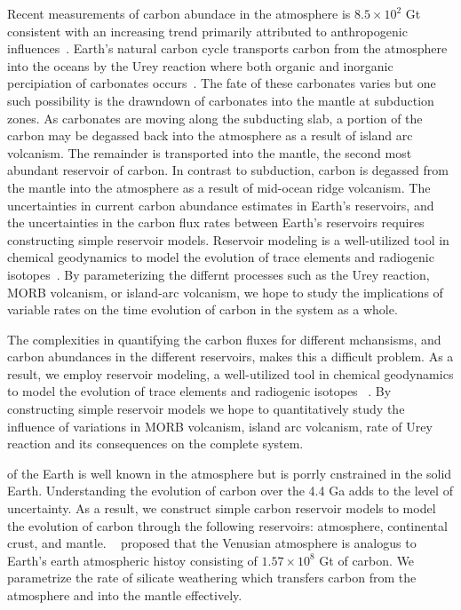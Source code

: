 Recent measurements of carbon abundace in the atmosphere is $8.5 \times 10^2$ Gt~\cite{NOAA:2017} consistent with an increasing trend primarily attributed to anthropogenic influences~\cite{DDJ:2015}. Earth's natural carbon cycle transports carbon from the atmosphere into the oceans by the Urey reaction where both organic and inorganic percipiation of carbonates occurs~\cite{UHC:1952}. The fate of these carbonates varies but one such possibility is the drawndown of carbonates into the mantle at subduction zones. As carbonates are moving along the subducting slab, a portion of the carbon may be degassed back into the atmosphere as a result of island arc volcanism. The remainder is transported into the mantle, the second most abundant reservoir of carbon. In contrast to subduction, carbon is degassed from the mantle into the atmosphere as a result of mid-ocean ridge volcanism. The uncertainties in current carbon abundance estimates in Earth's reservoirs, and the uncertainties in the carbon flux rates between Earth's reservoirs requires constructing simple reservoir models. Reservoir modeling is a well-utilized tool in chemical geodynamics to model the evolution of trace elements and radiogenic isotopes~\cite{ACJ-BO-DB:1980}. By parameterizing the differnt processes such as the Urey reaction, MORB volcanism, or island-arc volcanism, we hope to study the implications of variable rates on the time evolution of carbon in the system as a whole.



The complexities in quantifying the carbon fluxes for different mchansisms, and carbon abundances in the different reservoirs, makes this a difficult problem. As a result, we employ reservoir modeling, a well-utilized tool in chemical geodynamics to model the evolution of trace elements and radiogenic isotopes ~\cite{ACJ-BO-DB:1980, KLH-WGJ:1990, SNH-ZK:2001}. By constructing simple reservoir models we hope to quantitatively study the influence of variations in MORB volcanism, island arc volcanism, rate of Urey reaction and its consequences on the complete system.


of the Earth is well known in the atmosphere but is porrly cnstrained in the solid Earth. Understanding the evolution of carbon over the 4.4 Ga adds to the level of uncertainty. As a result, we construct simple carbon reservoir models to model the evolution of carbon through the following reservoirs: atmosphere, continental crust, and mantle. ~\citet{SNH-ZK:2001} proposed that the Venusian atmosphere is analogus to Earth's earth atmospheric histoy consisting of $1.57 \times 10^8$ Gt of carbon. We parametrize the rate of silicate weathering which transfers carbon from the atmosphere and into the mantle effectively. 


